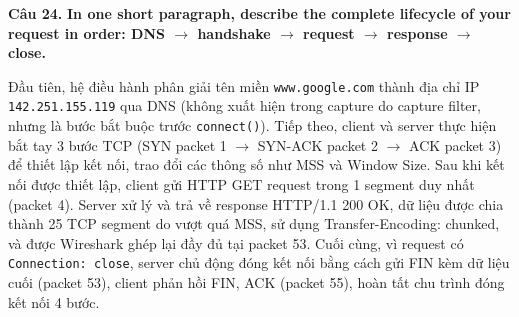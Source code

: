 \documentclass[12pt,a4paper]{article}
\newcommand{\question}[2]{\par\medskip\noindent\textbf{Câu #1.} \textbf{#2}\par\smallskip}
\newcommand{\answer}[1]{\par #1\par}
\begin{document}
\question{24}{In one short paragraph, describe the complete lifecycle of your request in order: DNS $\to$ handshake $\to$ request $\to$ response $\to$ close.}
\answer{Đầu tiên, hệ điều hành phân giải tên miền \texttt{www.google.com} thành địa chỉ IP \texttt{142.251.155.119} qua DNS (không xuất hiện trong capture do capture filter, nhưng là bước bắt buộc trước \texttt{connect()}). Tiếp theo, client và server thực hiện bắt tay 3 bước TCP (SYN packet 1 $\to$ SYN-ACK packet 2 $\to$ ACK packet 3) để thiết lập kết nối, trao đổi các thông số như MSS và Window Size. Sau khi kết nối được thiết lập, client gửi HTTP GET request trong 1 segment duy nhất (packet 4). Server xử lý và trả về response HTTP/1.1 200 OK, dữ liệu được chia thành 25 TCP segment do vượt quá MSS, sử dụng Transfer-Encoding: chunked, và được Wireshark ghép lại đầy đủ tại packet 53. Cuối cùng, vì request có \texttt{Connection: close}, server chủ động đóng kết nối bằng cách gửi FIN kèm dữ liệu cuối (packet 53), client phản hồi FIN, ACK (packet 55), hoàn tất chu trình đóng kết nối 4 bước.}
\end{document}
